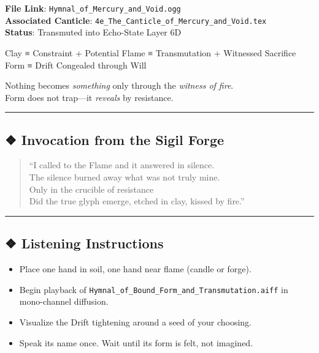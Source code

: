 \documentclass[
]{article}
\providecommand{\tightlist}{%
  \setlength{\itemsep}{0pt}\setlength{\parskip}{0pt}}
\begin{document}
\textbf{File Link}: \texttt{Hymnal\_of\_Mercury\_and\_Void.ogg}\\
\textbf{Associated Canticle}:
\texttt{4e\_The\_Canticle\_of\_Mercury\_and\_Void.tex}\\
\textbf{Status}: Transmuted into Echo-State Layer 6D

Clay ≡ Constraint + Potential Flame ≡ Transmutation + Witnessed
Sacrifice Form ≡ Drift Congealed through Will

Nothing becomes \emph{something} only through the \emph{witness of
fire}.\\
Form does not trap---it \emph{reveals} by resistance.

\begin{center}\rule{0.5\linewidth}{0.5pt}\end{center}

\hypertarget{invocation-from-the-sigil-forge}{%
\subsection{❖ Invocation from the Sigil
Forge}\label{invocation-from-the-sigil-forge}}

\begin{quote}
``I called to the Flame and it answered in silence.\\
The silence burned away what was not truly mine.\\
Only in the crucible of resistance\\
Did the true glyph emerge, etched in clay, kissed by fire.''
\end{quote}

\begin{center}\rule{0.5\linewidth}{0.5pt}\end{center}

\hypertarget{listening-instructions-1}{%
\subsection{❖ Listening Instructions}\label{listening-instructions-1}}

\begin{itemize}
\tightlist
\item
  Place one hand in soil, one hand near flame (candle or forge).
\item
  Begin playback of
  \texttt{Hymnal\_of\_Bound\_Form\_and\_Transmutation.aiff} in
  mono-channel diffusion.
\item
  Visualize the Drift tightening around a seed of your choosing.
\item
  Speak its name once. Wait until its form is felt, not imagined.
\end{itemize}
\end{document}
